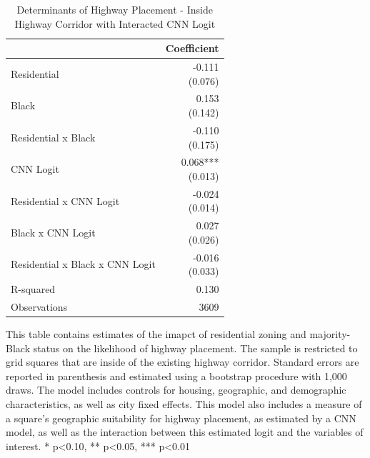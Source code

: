 \begin{table}[h]
\centering
\caption{Determinants of Highway Placement - Inside Highway Corridor with Interacted CNN Logit}
\label{tab:direct_results}
\begin{threeparttable}
\begin{tabular*}{0.6\textwidth}{@{\extracolsep{\fill}}l*{1}{r}}
\toprule
 & Coefficient \\
\midrule
Residential & \makecell[tr]{-0.111 \\ (0.076)} \\
Black & \makecell[tr]{0.153 \\ (0.142)} \\
Residential x Black & \makecell[tr]{-0.110 \\ (0.175)} \\
CNN Logit & \makecell[tr]{0.068{***} \\ (0.013)} \\
Residential x CNN Logit & \makecell[tr]{-0.024 \\ (0.014)} \\
Black x CNN Logit & \makecell[tr]{0.027 \\ (0.026)} \\
Residential x Black x CNN Logit & \makecell[tr]{-0.016 \\ (0.033)} \\
R-squared & 0.130 \\
Observations & 3609 \\
\bottomrule
\end{tabular*}
\begin{tablenotes}[flushleft]
\footnotesize
\item This table contains estimates of the imapct of residential zoning and majority-Black status on the likelihood of highway placement. The sample is restricted to grid squares that are inside of the existing highway corridor. Standard errors are reported in parenthesis and estimated using a bootstrap procedure with 1,000 draws. The model includes controls for housing, geographic, and demographic characteristics, as well as city fixed effects. This model also includes a measure of a square's geographic suitability for highway placement, as estimated by a CNN model, as well as the interaction between this estimated logit and the variables of interest. * p<0.10, ** p<0.05, *** p<0.01
\end{tablenotes}
\end{threeparttable}
\end{table}
